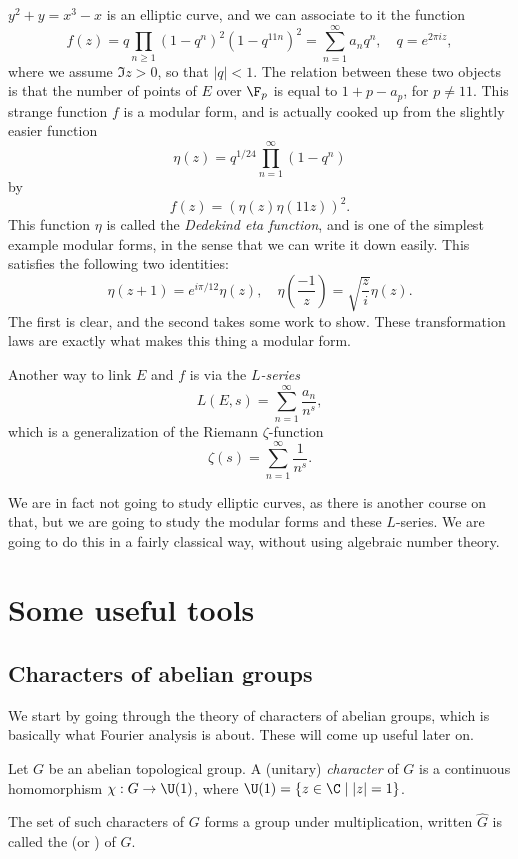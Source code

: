 \documentclass[a4paper]{article}
\begin{document}
\begin{eg}
  $y^2 + y = x^3 - x$ is an elliptic curve, and we can associate to it the function
  \[
    f(z) = q\prod_{n \geq 1} (1 - q^n)^2 (1 - q^{11n})^2 = \sum_{n = 1}^\infty a_n q^n,\quad q= e^{2\pi i z},
  \]
  where we assume $\Im z > 0$, so that $|q| < 1$. The relation between these two objects is that the number of points of $E$ over $\F_p$ is equal to $1 + p - a_p$, for $p \not= 11$. This strange function $f$ is a modular form, and is actually cooked up from the slightly easier function
  \[
    \eta(z) = q^{1/24} \prod_{n = 1}^\infty (1 - q^n)
  \]
  by
  \[
    f(z) = (\eta(z)\eta(11z))^2.
  \]
  This function $\eta$ is called the \emph{Dedekind eta function}, and is one of the simplest example modular forms, in the sense that we can write it down easily. This satisfies the following two identities:
  \[
    \eta(z + 1) = e^{i \pi/12}\eta(z),\quad \eta\left(\frac{-1}{z}\right) = \sqrt{\frac{z}{i}} \eta(z).
  \]
  The first is clear, and the second takes some work to show. These transformation laws are exactly what makes this thing a modular form.

  Another way to link $E$ and $f$ is via the \emph{$L$-series}
  \[
    L(E, s) = \sum_{n = 1}^\infty \frac{a_n}{n^s},
  \]
  which is a generalization of the Riemann $\zeta$-function
  \[
    \zeta(s) = \sum_{n = 1}^\infty \frac{1}{n^s}.
  \]
\end{eg}
We are in fact not going to study elliptic curves, as there is another course on that, but we are going to study the modular forms and these $L$-series. We are going to do this in a fairly classical way, without using algebraic number theory.

\section{Some useful tools}
\subsection{Characters of abelian groups}
We start by going through the theory of characters of abelian groups, which is basically what Fourier analysis is about. These will come up useful later on.

\begin{defi}[Character]
  Let $G$ be an abelian topological group. A (unitary) \emph{character} of $G$ is a continuous homomorphism $\chi: G \to \U(1)$, where $\U(1) = \{z \in \C \mid |z| = 1\}$.

  The set of such characters of $G$ forms a group under multiplication, written $\hat{G}$ is called the  (or ) of $G$.
\end{defi}
\end{document}
